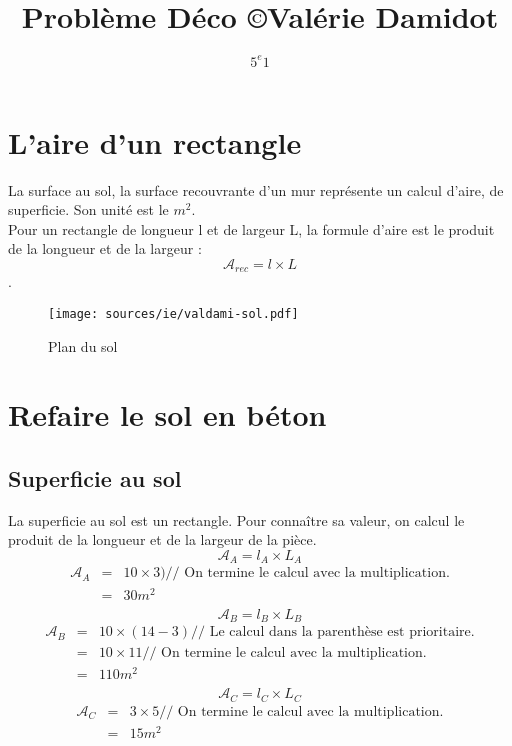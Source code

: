 \documentclass[11pt]{article}
\title{Problème Déco  \copyright Valérie Damidot} %
\author{$5^e 1$}
\begin{document}

\maketitle %

\section{L'aire d'un rectangle}

La surface au sol, la surface recouvrante d'un mur représente un calcul d'aire, de superficie. Son unité est le $m^2$.\\
Pour un rectangle de longueur l et de largeur L, la formule d'aire est le produit de la longueur et de la largeur :
$$\mathcal{A}_{rec} = l \times L$$.

\begin{figure}[H]
  \centering
  \texttt{[image: sources/ie/valdami-sol.pdf]}
  \caption{Plan du sol}
  \label{fig:ch1-plan}
\end{figure}

\section{Refaire le sol en béton}

\subsection{Superficie au sol}

La superficie au sol est un rectangle. Pour connaître sa valeur, on calcul le produit de la longueur et de la largeur de la pièce.
$$\mathcal{A}_{A} = l_A \times L_A$$
\begin{eqnarray*}
  \mathcal{A}_{A} & = & 10 \times 3)  \text{// On termine le calcul avec la multiplication.}\\
  & = & 30 m^2\\
\end{eqnarray*}
$$\mathcal{A}_{B} = l_B \times L_B$$
\begin{eqnarray*}
  \mathcal{A}_{B} & = & 10 \times (14 - 3) \text{//  Le calcul dans la parenthèse est prioritaire.}\\
  & = & 10 \times 11 \text {// On termine le calcul avec la multiplication.}\\
  & = & 110 m^2\\
\end{eqnarray*}
$$\mathcal{A}_{C} = l_C \times L_C$$
\begin{eqnarray*}
  \mathcal{A}_{C} & = & 3 \times 5 \text{// On termine le calcul avec la multiplication.}\\
  & = & 15 m^2
\end{eqnarray*}
\end{document}
